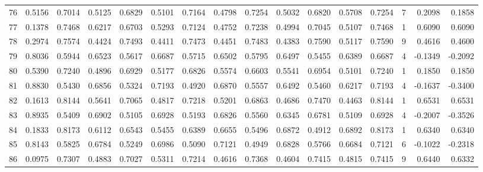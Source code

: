 \begin{tabular}{lrrrrrrrrrrrrrrr}
76  &      0.5156 &  0.7014 &  0.5125 &  0.6829 &  0.5101 &  0.7164 &  0.4798 &  0.7254 &  0.5032 &  0.6820 &   0.5708 &     0.7254 &      7 &                    0.2098 &                     0.1858 \\
77  &      0.1378 &  0.7468 &  0.6217 &  0.6703 &  0.5293 &  0.7124 &  0.4752 &  0.7238 &  0.4994 &  0.7045 &   0.5107 &     0.7468 &      1 &                    0.6090 &                     0.6090 \\
78  &      0.2974 &  0.7574 &  0.4424 &  0.7493 &  0.4411 &  0.7473 &  0.4451 &  0.7483 &  0.4383 &  0.7590 &   0.5117 &     0.7590 &      9 &                    0.4616 &                     0.4600 \\
79  &      0.8036 &  0.5944 &  0.6523 &  0.5617 &  0.6687 &  0.5715 &  0.6502 &  0.5795 &  0.6497 &  0.5455 &   0.6389 &     0.6687 &      4 &                   -0.1349 &                    -0.2092 \\
80  &      0.5390 &  0.7240 &  0.4896 &  0.6929 &  0.5177 &  0.6826 &  0.5574 &  0.6603 &  0.5541 &  0.6954 &   0.5101 &     0.7240 &      1 &                    0.1850 &                     0.1850 \\
81  &      0.8830 &  0.5430 &  0.6856 &  0.5324 &  0.7193 &  0.4920 &  0.6870 &  0.5557 &  0.6492 &  0.5460 &   0.6217 &     0.7193 &      4 &                   -0.1637 &                    -0.3400 \\
82  &      0.1613 &  0.8144 &  0.5641 &  0.7065 &  0.4817 &  0.7218 &  0.5201 &  0.6863 &  0.4686 &  0.7470 &   0.4463 &     0.8144 &      1 &                    0.6531 &                     0.6531 \\
83  &      0.8935 &  0.5409 &  0.6902 &  0.5105 &  0.6928 &  0.5193 &  0.6826 &  0.5560 &  0.6345 &  0.6781 &   0.5109 &     0.6928 &      4 &                   -0.2007 &                    -0.3526 \\
84  &      0.1833 &  0.8173 &  0.6112 &  0.6543 &  0.5455 &  0.6389 &  0.6655 &  0.5496 &  0.6872 &  0.4912 &   0.6892 &     0.8173 &      1 &                    0.6340 &                     0.6340 \\
85  &      0.8143 &  0.5825 &  0.6784 &  0.5249 &  0.6986 &  0.5090 &  0.7121 &  0.4949 &  0.6828 &  0.5766 &   0.6684 &     0.7121 &      6 &                   -0.1022 &                    -0.2318 \\
86  &      0.0975 &  0.7307 &  0.4883 &  0.7027 &  0.5311 &  0.7214 &  0.4616 &  0.7368 &  0.4604 &  0.7415 &   0.4815 &     0.7415 &      9 &                    0.6440 &                     0.6332 \\

\end{tabular}

